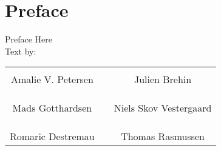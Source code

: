 \chapter*{Preface}

Preface Here\\

Text by:\\
%
\begin{table}[H]
	\centering
		\begin{tabular}{c c c}
			\underline{\phantom{JAERJAERJAERJAERGO}} & \phantom{cookies} & \underline{\phantom{JAERJAERJAERJAERGO}} \\
			Amalie V. Petersen			& \phantom{cookies} & Julien Brehin		\\
			&&\\
			&&\\
			\underline{\phantom{JAERJAERJAERJAERGO}} & \phantom{cookies} & \underline{\phantom{JAERJAERJAERJAERGO}} \\
			Mads Gotthardsen			& \phantom{cookies} & Niels Skov Vestergaard		\\
			&&\\
			&&\\
	    \underline{\phantom{JAERJAERJAERJAERGO}} & \phantom{cookies} & \underline{\phantom{JAERJAERJAERJAERGO}} \\
			Romaric Destremau 					& \phantom{cookies} & Thomas Rasmussen 			\\			
		\end{tabular}
\end{table}